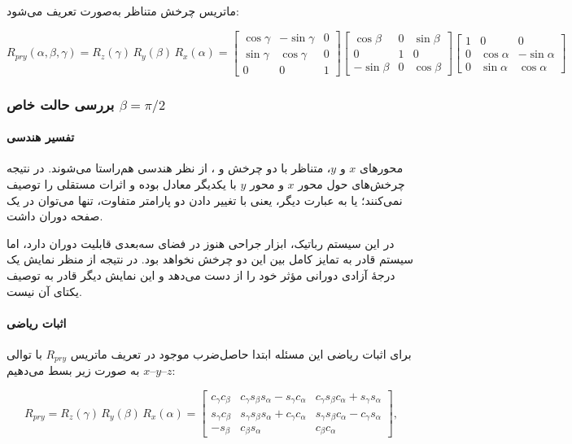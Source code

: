 \documentclass{article}
\begin{document}
ماتریس چرخش متناظر  به‌صورت تعریف می‌شود: 

\[
R_{pry}(\alpha,\beta,\gamma)
= R_z(\gamma)\, R_y(\beta)\, R_x(\alpha)
= 
\begin{bmatrix}
	\cos\gamma & -\sin\gamma & 0 \\
	\sin\gamma & \cos\gamma & 0 \\
	0 & 0 & 1
\end{bmatrix}
\begin{bmatrix}
	\cos\beta & 0 & \sin\beta \\
	0 & 1 & 0 \\
	-\sin\beta & 0 & \cos\beta
\end{bmatrix} 
\begin{bmatrix}
	1 & 0 & 0 \\
	0 & \cos\alpha & -\sin\alpha \\
	0 & \sin\alpha & \cos\alpha
\end{bmatrix} 
\]

\subsubsection{بررسی حالت خاص $\beta = \pi/2$}

\paragraph{تفسیر هندسی}

محورهای $x$ و $y$، متناظر با دو چرخش  و ، از نظر هندسی هم‌راستا می‌شوند. در نتیجه چرخش‌های حول محور $x$ و محور  $y$ با یکدیگر معادل بوده و اثرات مستقلی را توصیف نمی‌کنند؛ یا به عبارت دیگر،  یعنی با تغییر دادن دو پارامتر متفاوت، تنها می‌توان در یک صفحه دوران داشت.

در این سیستم رباتیک، ابزار جراحی هنوز در فضای سه‌بعدی قابلیت دوران دارد، اما سیستم قادر به تمایز کامل بین این دو چرخش نخواهد بود. در نتیجه از منظر نمایش  یک درجهٔ آزادی دورانی مؤثر خود را از دست می‌دهد و این نمایش دیگر قادر به توصیف یکتای آن نیست. 

\paragraph{اثبات ریاضی}

برای اثبات ریاضی این مسئله ابتدا حاصل‌ضرب موجود در تعریف ماتریس $R_{pry}$ با توالی $z$--$y$--$x$ به صورت زیر بسط می‌دهیم:

\[
R_{pry} = R_z(\gamma)\,R_y(\beta)\,R_x(\alpha)
= \begin{bmatrix}
	c_\gamma c_\beta &
	c_\gamma s_\beta s_\alpha - s_\gamma c_\alpha &
	c_\gamma s_\beta c_\alpha + s_\gamma s_\alpha
	\\[4pt]
	s_\gamma c_\beta &
	s_\gamma s_\beta s_\alpha + c_\gamma c_\alpha &
	s_\gamma s_\beta c_\alpha - c_\gamma s_\alpha
	\\[4pt]
	-s_\beta &
	c_\beta s_\alpha &
	c_\beta c_\alpha
\end{bmatrix},
\]
\end{document}
